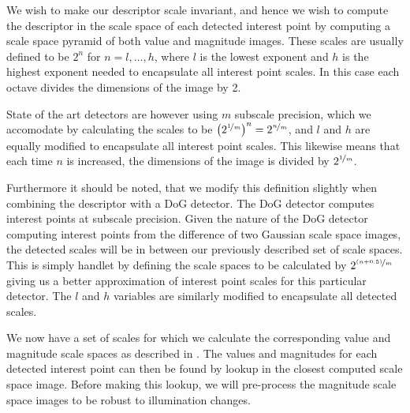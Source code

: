 \documentclass[thesis.tex]{subfiles}
\begin{document}
We wish to make our descriptor scale invariant, and hence we wish to compute the descriptor in the scale space of each detected interest point by computing a scale space pyramid of both value and magnitude images. These scales are usually defined to be $2^n$ for $n = l,\hdots,h$, where $l$ is the lowest exponent and $h$ is the highest exponent needed to encapsulate all interest point scales. In this case each octave divides the dimensions of the image by 2.

State of the art detectors are however using $m$ subscale precision, which we accomodate by calculating the scales to be $\left(2^{\nicefrac{1}{m}}\right)^n = 2^{\nicefrac{n}{m}}$, and $l$ and $h$ are equally modified to encapsulate all interest point scales. This likewise means that each time $n$ is increased, the dimensions of the image is divided by $2^{\nicefrac{1}{m}}$.

Furthermore it should be noted, that we modify this definition slightly when combining the descriptor with a DoG detector. The DoG detector computes interest points at subscale precision. Given the nature of the DoG detector computing interest points from the difference of two Gaussian scale space images, the detected scales will be in between our previously described set of scale spaces. This is simply handlet by defining the scale spaces to be calculated by $2^{\nicefrac{(n+0.5)}{m}}$ giving us a better approximation of interest point scales for this particular detector. The $l$ and $h$ variables are similarly modified to encapsulate all detected scales.

We now have a set of scales for which we calculate the corresponding value and magnitude scale spaces as described in . The values and magnitudes for each detected interest point can then be found by lookup in the closest computed scale space image. Before making this lookup, we will pre-process the magnitude scale space images to be robust to illumination changes.
\end{document}
